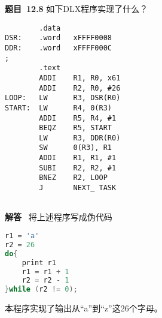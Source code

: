 \documentclass[10pt,a4paper,UTF8]{ctexart}
\newcommand{\problemname}{待定义}
\newenvironment{problem}{\begin{shaded}\par\noindent\textbf{题目\  \problemname}}{\end{shaded}\par}
\newenvironment{solution}{\par\noindent\textbf{解答}\ }{\par}
\begin{document}
\renewcommand{\problemname}{12.8}
\begin{problem}
	如下DLX程序实现了什么？
	\begin{lstlisting}
		.data
DSR:	.word	xFFFF0008	 
DDR:	.word	xFFFF000C 
; 
		.text	
		ADDI	R1, R0, x61 
		ADDI	R2, R0, #26 
LOOP:	LW		R3, DSR(R0) 
START:	LW		R4, 0(R3) 
		ADDI	R5, R4, #1 
		BEQZ	R5, START	
		LW		R3, DDR(R0) 
		SW		0(R3), R1 
		ADDI	R1, R1, #1 
		SUBI	R2, R2, #1 
		BNEZ	R2, LOOP 
		J		NEXT_ TASK
	
	\end{lstlisting}
\end{problem}

\begin{solution}
	将上述程序写成伪代码
	\begin{lstlisting}[language=C]
r1 = 'a'
r2 = 26
do{
	print r1
	r1 = r1 + 1
	r2 = r2 - 1
}while (r2 != 0);
	\end{lstlisting}
	本程序实现了输出从“a”到“z”这26个字母。
\end{solution}
\end{document}
